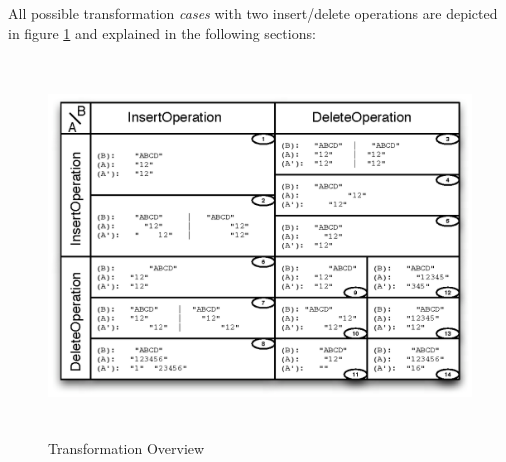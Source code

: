 All possible transformation \emph{cases} with two insert/delete operations are depicted in figure \ref{Transformation Overview} and explained in the following sections:
\begin{figure}[H]
\centering
\includegraphics[height=9.98cm,width=13.75cm]{../../images/algo-impl/transform_overview.eps}
\caption{Transformation Overview}
\label{Transformation Overview}
\end{figure}

